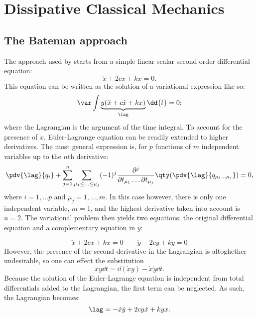 \chapter{Dissipative Classical Mechanics}
\section{The Bateman approach}
The approach used by \citet{Bateman1931} starts from a simple linear scalar second-order differential equation:
$$ \ddot{x} + 2c\dot{x} + kx = 0.$$
This equation can be written as the solution of a variational expression like so:
$$ \var \int \underbrace{y(\ddot{x} + c\dot{x} + kx )}_{\lag} \dd{t} = 0; $$
where the Lagrangian is the argument of the time integral. To account for the presence of $\ddot{x}$, Euler-Lagrange equation can be readily extended to higher derivatives. The most general expression is, for $p$ functions of $m$ independent variables up to the $n$th derivative: 
$$ \pdv{\lag}{q_i} 
   + \sum^n_{j=1} \sum_{\mu_1\leq\ldots\leq\mu_j} (-1)^j \frac{\partial^j}{\partial t_{\mu_1} \ldots \partial t_{\mu_j}} \qty(\pdv{\lag}{q_{\mu_1\ldots\mu_j}})= 0, $$ 
where $i = 1, \ldots p$ and $\mu_j = 1,\ldots,m$.
In this case however, there is only one independent variable, $m = 1$, and the highest derivative taken into account is $n = 2$. The variational problem then yields two equations: the original differential equation and a complementary equation in $y$:

$$ \ddot{x} + 2c\dot{x} + kx = 0 \qquad \ddot{y} - 2c\dot{y} + ky = 0 $$
However, the presence of the second derivative in the Lagrangian is altoghether undesirable, so one can effect the substitution
$$ \ddot{x}y\dd{t} = \dd{(\dot{x}y)} - \dot{x}\dot{y}\dd{t}.$$
Because the solution of the Euler-Lagrange equation is independent from total differentials added to the Lagrangian, the first term can be neglected. As such, the Lagrangian becomes:
$$ \lag = -\dot{x}\dot{y} + 2cy\dot{x} + kyx. $$

